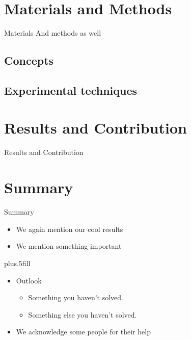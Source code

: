 \section{Materials and Methods}
\begin{frame}{Materials}
             {And methods as well}

\end{frame}
  \subsection{Concepts}

  \subsection{Experimental techniques}


\section{Results and Contribution}
\begin{frame}{Results and Contribution}

\end{frame}


\section*{Summary}
\begin{frame}{Summary}
  \begin{itemize}
  \item[\cmark] We again mention our cool results
  \item We mention something important
  \end{itemize}
  
  \vskip0pt plus.5fill
  \begin{itemize}
  \item
    Outlook
    \begin{itemize}
    \item[\xmark]
      Something you haven't solved.
    \item
      Something else you haven't solved.
    \end{itemize}
  \item[\ding{43}] We acknowledge some people for their help
  \end{itemize}
\end{frame}


